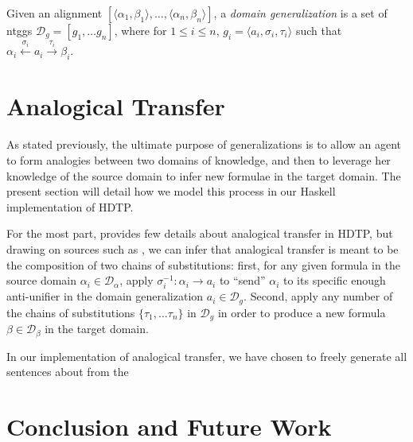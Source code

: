 \documentclass[12pt,a4paper]{article}
\begin{document}
\begin{definition}
    Given an alignment $[\langle \alpha_1, \beta_1\rangle, \dots, \langle \alpha_n, \beta_n\rangle ]$, a \textit{domain generalization} is a set of ntggs $ \mathcal{D}_g = [ g_1, \dots g_n ]$, where for $1 \le i \le n$, $g_i = \langle a_i, \sigma_i, \tau_i\rangle$ such that $\alpha_i \xleftarrow{\sigma_i} a_i \xrightarrow{\tau_i} \beta_i$.
\end{definition}




\section{Analogical Transfer}
As stated previously, the ultimate purpose of generalizations is to allow an agent to form analogies between two domains of knowledge, and then to leverage her knowledge of the source domain to infer new formulae in the target domain. The present section will detail how we model this process in our Haskell implementation of HDTP.
% 

For the most part, \cite{Schmidt-2014} provides few details about analogical transfer in HDTP, but drawing on sources such as \cite{Schwering2009SyntacticPO}, we can infer that analogical transfer is meant to be the composition of two chains of substitutions: first, for any given formula in the source domain $\alpha_i \in \mathcal{D}_\alpha$, apply $\sigma_i^{-1} : \alpha_i \to a_i$ to ``send'' $\alpha_i$ to its specific enough anti-unifier in the domain generalization $a_i \in \mathcal{D}_g$.
Second, apply any number of the chains of substitutions $\{\tau_1, \dots \tau_n\}$ in $\mathcal{D}_g$ in order to produce a new formula $\beta \in \mathcal{D}_\beta$ in the target domain.

In our implementation of analogical transfer, we have chosen to freely generate all sentences about from the 






\section{Conclusion and Future Work}
% 





\end{document}
